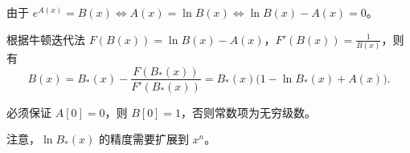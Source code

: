 由于 $e^{A(x)} = B(x) \Leftrightarrow A(x) = \ln B(x) \Leftrightarrow \ln B(x) - A(x) = 0$。

根据牛顿迭代法 $F(B(x)) = \ln B(x) - A(x)$，$F'(B(x)) = \frac{1}{B(x)}$，则有
\[
B(x) = B_*(x) - \frac{F(B_*(x))}{F'(B_*(x))} = B_*(x)\bigl(1 - \ln B_*(x) + A(x)\bigr).
\]

必须保证 $A[0] = 0$，则 $B[0] = 1$，否则常数项为无穷级数。

注意，$\ln B_*(x)$ 的精度需要扩展到 $x^n$。